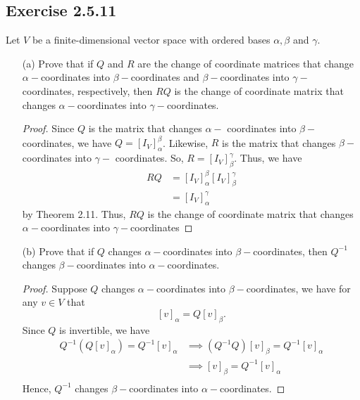 \subsection*{Exercise 2.5.11} Let \( V  \) be a finite-dimensional vector space with ordered bases \( \alpha, \beta  \) and \( \gamma \).
\begin{enumerate}
    \item[(a)] Prove that if \( Q  \) and \( R  \) are the change of coordinate matrices that change \( \alpha- \)coordinates into \( \beta- \)coordinates and \( \beta- \)coordinates into \( \gamma- \)coordinates, respectively, then \( RQ  \) is the change of coordinate matrix that changes \( \alpha-  \)coordinates into \( \gamma- \)coordinates. 
        \begin{proof}
        Since \( Q  \) is the matrix that changes \( \alpha-\) coordinates into \( \beta- \)coordinates, we have \( Q = [{I}_{V}]_{\alpha}^{\beta}  \). Likewise, \( R  \) is the matrix that changes \( \beta - \)coordinates into \( \gamma-\) coordinates. So, \( R = [{I}_{V}]_{\beta}^{\gamma}  \). Thus, we have
        \begin{align*}
            RQ &= [{I}_{V}]_{\alpha}^{\beta} [{I}_{V}]_{\beta}^{\gamma}  \\
               &= [{I}_{V}]_{\alpha}^{\gamma} 
        \end{align*}
        by Theorem 2.11. Thus, \( RQ  \) is the change of coordinate matrix that changes \( \alpha-  \)coordinates into \( \gamma- \)coordinates
        \end{proof}
    \item[(b)] Prove that if \( Q  \) changes \( \alpha- \)coordinates into \( \beta- \)coordinates, then \( Q^{-1} \) changes \( \beta-  \)coordinates into \( \alpha- \)coordinates.
        \begin{proof}
            Suppose \( Q  \) changes \( \alpha- \)coordinates into \( \beta- \)coordinates, we have for any \( v \in V  \) that
            \[  [v]_{\alpha} = Q [v]_{\beta}. \tag{1} \]
            Since \( Q  \) is invertible, we have
            \begin{align*} Q^{-1} (Q [v]_{\alpha}) = Q^{-1} [v]_{\alpha} &\implies (Q^{-1}Q) [v]_{\beta} = Q^{-1} [v]_{\alpha} \\
            &\implies [v]_{\beta} = Q^{-1} [v]_{\alpha} \\
            \end{align*}
            Hence, \( Q^{-1} \) changes \( \beta- \)coordinates into \( \alpha - \)coordinates.
        \end{proof}
\end{enumerate}

